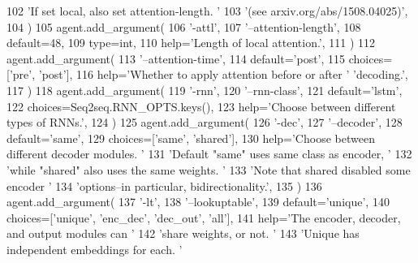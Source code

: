 \begin{DoxyCode}
102             \textcolor{stringliteral}{'If set local, also set attention-length. '}
103             \textcolor{stringliteral}{'(see arxiv.org/abs/1508.04025)'},
104         )
105         agent.add\_argument(
106             \textcolor{stringliteral}{'-attl'},
107             \textcolor{stringliteral}{'--attention-length'},
108             default=48,
109             type=int,
110             help=\textcolor{stringliteral}{'Length of local attention.'},
111         )
112         agent.add\_argument(
113             \textcolor{stringliteral}{'--attention-time'},
114             default=\textcolor{stringliteral}{'post'},
115             choices=[\textcolor{stringliteral}{'pre'}, \textcolor{stringliteral}{'post'}],
116             help=\textcolor{stringliteral}{'Whether to apply attention before or after '} \textcolor{stringliteral}{'decoding.'},
117         )
118         agent.add\_argument(
119             \textcolor{stringliteral}{'-rnn'},
120             \textcolor{stringliteral}{'--rnn-class'},
121             default=\textcolor{stringliteral}{'lstm'},
122             choices=Seq2seq.RNN\_OPTS.keys(),
123             help=\textcolor{stringliteral}{'Choose between different types of RNNs.'},
124         )
125         agent.add\_argument(
126             \textcolor{stringliteral}{'-dec'},
127             \textcolor{stringliteral}{'--decoder'},
128             default=\textcolor{stringliteral}{'same'},
129             choices=[\textcolor{stringliteral}{'same'}, \textcolor{stringliteral}{'shared'}],
130             help=\textcolor{stringliteral}{'Choose between different decoder modules. '}
131             \textcolor{stringliteral}{'Default "same" uses same class as encoder, '}
132             \textcolor{stringliteral}{'while "shared" also uses the same weights. '}
133             \textcolor{stringliteral}{'Note that shared disabled some encoder '}
134             \textcolor{stringliteral}{'options--in particular, bidirectionality.'},
135         )
136         agent.add\_argument(
137             \textcolor{stringliteral}{'-lt'},
138             \textcolor{stringliteral}{'--lookuptable'},
139             default=\textcolor{stringliteral}{'unique'},
140             choices=[\textcolor{stringliteral}{'unique'}, \textcolor{stringliteral}{'enc\_dec'}, \textcolor{stringliteral}{'dec\_out'}, \textcolor{stringliteral}{'all'}],
141             help=\textcolor{stringliteral}{'The encoder, decoder, and output modules can '}
142             \textcolor{stringliteral}{'share weights, or not. '}
143             \textcolor{stringliteral}{'Unique has independent embeddings for each. '}

\end{DoxyCode}
